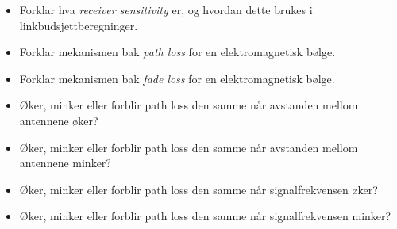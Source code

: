 \begin{itemize}
\item{} Forklar hva {\it receiver sensitivity} er, og hvordan dette brukes i linkbudsjettberegninger.
\item{} Forklar mekanismen bak {\it path loss} for en elektromagnetisk bølge.
\item{} Forklar mekanismen bak {\it fade loss} for en elektromagnetisk bølge.
\item{} Øker, minker eller forblir path loss den samme når avstanden mellom antennene øker?
\item{} Øker, minker eller forblir path loss den samme når avstanden mellom antennene minker?
\item{} Øker, minker eller forblir path loss den samme når signalfrekvensen øker?
\item{} Øker, minker eller forblir path loss den samme når signalfrekvensen minker?
\end{itemize}




